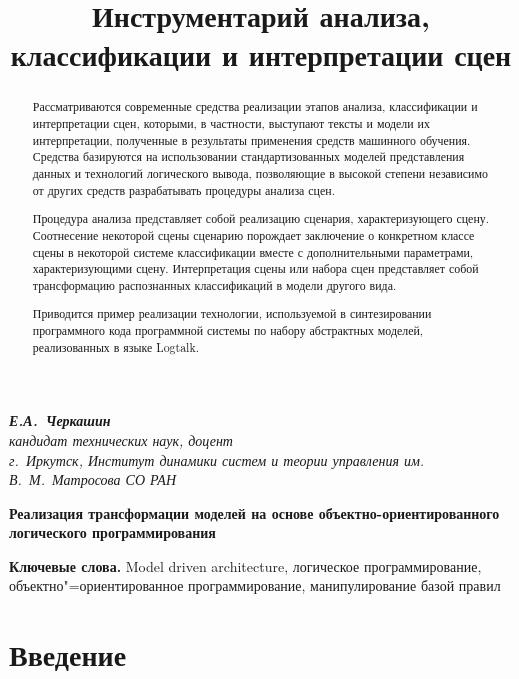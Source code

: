 \documentclass[12pt]{article}
\begin{document}

\title{Инструментарий анализа, классификации и интерпретации
сцен}

\maketitle

\begin{flushright}\itshape{}
  \textbf{Е.А.~Черкашин}\\
  кандидат технических наук, доцент\\
  г.~Иркутск, Институт динамики систем и теории управления им. В.~М.~Матросова СО РАН
\end{flushright}
\begin{center}
  \Large\bfseries Реализация трансформации моделей на основе объектно-ориентированного логического программирования
\end{center}

\begin{abstract}
  Рассматриваются современные средства реализации этапов анализа, классификации и интерпретации сцен, которыми, в частности, выступают тексты и модели их интерпретации, полученные в результаты применения средств машинного обучения. Средства базируются на использовании стандартизованных моделей представления данных и технологий логического вывода, позволяющие в высокой степени независимо от других средств разрабатывать процедуры анализа сцен.

  Процедура анализа представляет собой реализацию сценария, характеризующего сцену. Соотнесение некоторой сцены сценарию порождает заключение о конкретном классе сцены в некоторой системе классификации вместе с дополнительными параметрами, характеризующими сцену. Интерпретация сцены или набора сцен представляет собой трансформацию распознанных классификаций в модели другого вида.

  Приводится пример реализации технологии, используемой в синтезировании программного кода программной системы по набору абстрактных моделей, реализованных в языке Logtalk.
\end{abstract}

\textbf{Ключевые слова.} Model driven architecture, логическое программирование, объектно"=ориентированное программирование, манипулирование базой правил\\


\section*{Введение}
\end{document}

